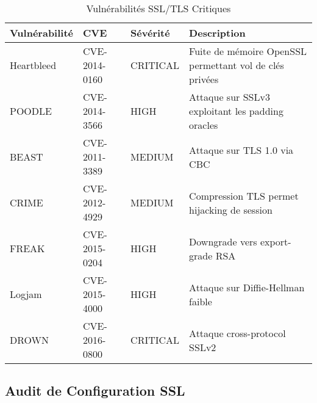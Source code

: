 \documentclass[11pt,a4paper]{report}
\begin{document}
\begin{table}[H]
\centering
\caption{Vulnérabilités SSL/TLS Critiques}
\label{tab:ssl_vulnerabilities}
\begin{tabular}{|p{3cm}|p{2cm}|p{3cm}|p{4cm}|}
\hline
\textbf{Vulnérabilité} & \textbf{CVE} & \textbf{Sévérité} & \textbf{Description} \\
\hline
Heartbleed & CVE-2014-0160 & CRITICAL & Fuite de mémoire OpenSSL permettant vol de clés privées \\
\hline
POODLE & CVE-2014-3566 & HIGH & Attaque sur SSLv3 exploitant les padding oracles \\
\hline
BEAST & CVE-2011-3389 & MEDIUM & Attaque sur TLS 1.0 via CBC \\
\hline
CRIME & CVE-2012-4929 & MEDIUM & Compression TLS permet hijacking de session \\
\hline
FREAK & CVE-2015-0204 & HIGH & Downgrade vers export-grade RSA \\
\hline
Logjam & CVE-2015-4000 & HIGH & Attaque sur Diffie-Hellman faible \\
\hline
DROWN & CVE-2016-0800 & CRITICAL & Attaque cross-protocol SSLv2 \\
\hline
\end{tabular}
\end{table}

\subsection{Audit de Configuration SSL}
\end{document}
